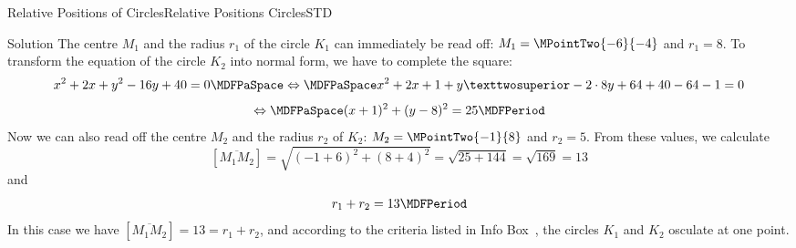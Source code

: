 \begin{MXContent}{Relative Positions of Circles}{Relative Positions Circles}{STD}
\begin{MExercise}
\begin{MHint}{Solution}
The centre $M_1$ and the radius $r_1$ of the circle $K_1$ can immediately be read off: $M_1=\MPointTwo{-6}{-4}$ and $r_1=8$. To transform the equation of the circle $K_2$ into normal form, 
we have to complete the square:
\[
 x^2+2x+y^2-16y+40=0\MDFPaSpace\Leftrightarrow\MDFPaSpace x^2+2x+1 + y²-2\cdot8y+64+40-64-1=0
\]
\[
 \Leftrightarrow\MDFPaSpace (x+1)^2+(y-8)^2=25\MDFPeriod
\]
Now we can also read off the centre $M_2$ and the radius $r_2$ of $K_2$: $M_2=\MPointTwo{-1}{8}$ and $r_2=5$. 
From these values, we calculate
\[
 [\overline{M_1 M_2}]=\sqrt{(-1+6)^2+(8+4)^2}=\sqrt{25+144}=\sqrt{169}=13
\]
and
\[
 r_1+r_2=13 \MDFPeriod
\]
In this case we have $[\overline{M_1 M_2}]=13=r_1+r_2$, and according to the criteria listed in 
Info Box~, the circles $K_1$ and $K_2$ osculate at one point.
\end{MHint}

\end{MExercise}

\end{MXContent}

